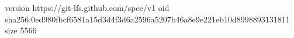 version https://git-lfs.github.com/spec/v1
oid sha256:0ed980fbcf6581a15d3d4f3d6a2596a5207b46a8e9e221eb10d8998893131811
size 5566
